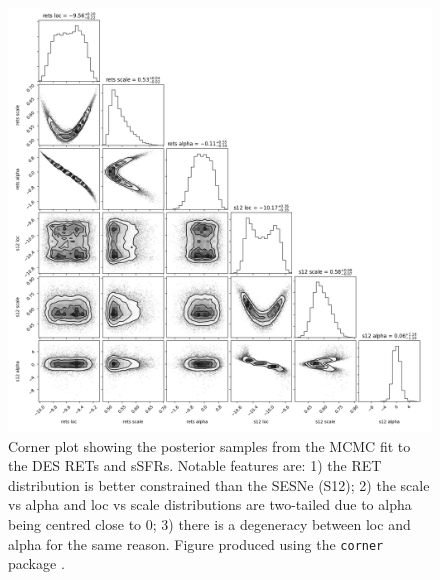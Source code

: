 \documentclass[fleqn,usenatbib,]{mnras}
\newcommand{\replychris}[1]{\color{magenta}#1 \color{black}}
\begin{document}
\begin{figure}
\includegraphics[width=\textwidth]{mc_figs/rets_s12_ssfr_corner_final.png}
\caption{\replychris{Corner plot showing the posterior samples from the MCMC fit to the DES RETs and \citet{Sanders2012} sSFRs. Notable features are: 1) the RET distribution is better constrained than the SESNe (S12); 2) the scale vs alpha and loc vs scale distributions are two-tailed due to alpha being centred close to 0; 3) there is a degeneracy between loc and alpha for the same reason. Figure produced using the \texttt{corner} package \citep{Foreman-Mackey2016}.}
\label{fig:corner}}
\end{figure}
\end{document}
